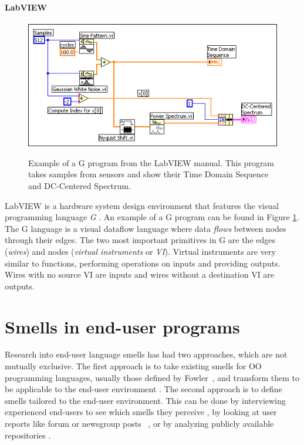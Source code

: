 \documentclass{sig-alternate}
\begin{document}
\paragraph{LabVIEW}
\begin{figure}
\caption{Example of a G program from the LabVIEW manual. This program takes samples from sensors and show their Time Domain Sequence and DC-Centered Spectrum.}
\centering
\includegraphics[width=\columnwidth]{img/labview-1}
\label{fig:labviewexample}
\end{figure}

LabVIEW is a hardware system design environment that features the visual programming language \emph{G} . 
An example of a G program can be found in Figure \ref{fig:labviewexample}.
The G language is a visual dataflow language where data \emph{flows} between nodes through their edges.
The two most important primitives in G are the edges  (\textit{wires}) and nodes  (\textit{virtual instruments} or \emph{VI}).
Virtual instruments are very similar to functions,  performing  operations on inputs and providing outputs.
Wires with no source VI are inputs and wires without a destination VI are outputs. 


\section{Smells in end-user programs}
\label{sec:smells}
Research into end-user language smells has had two approaches, which are not mutually exclusive.
The first approach is to take existing smells for OO programming languages, usually those defined by Fowler~\cite{Fowl1999}, and transform them to be applicable to the end-user environment \cite{Hermans2012inter,Hermans2012intra,Stolee2011,StoleeTSE2013, chambers2013smell}.
The second approach is to define smells tailored to the end-user environment.
This can be done by interviewing experienced end-users to see which smells they perceive \cite{chambers2013smell}, by looking at user reports like forum or newsgroup posts~ \cite{badame2012refactoring,chambers2013smell}, or by analyzing publicly available repositories \cite{Stolee2011,StoleeTSE2013}.
\end{document}
